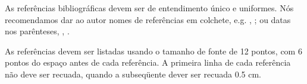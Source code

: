 \documentclass[a4paper, 12pt]{article}
\newcommand{\citeb}[1]{\bibleftbracket\cite{#1}\bibrightbracket}
\begin{document}
    As referências bibliográficas devem ser de entendimento único e uniformes.
    Nós recomendamos dar ao autor nomes de referências em colchete, e.g.
    \citeb{knuth}, \citeb{smith};
    ou datas nos parênteses, \textcite{knuth}, \textcite{smith}.
    
    As referências devem ser listadas usando o tamanho de fonte de 12 pontos,
    com 6 pontos do espaço antes de cada referência.
    A primeira linha de cada referência não deve ser recuada,
    quando a subseqüente dever ser recuada 0.5 cm.
    \clearpage

    \nocite{*}

    \sectionfont{\raggedright}
    \printbibliography
    
\end{document}
